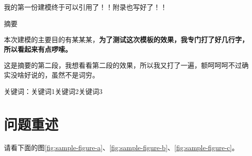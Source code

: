 \documentclass[a4paper,12pt]{ctexart} %
\let\heiti\relax
\begin{document}
    \begin{center}
        {\heiti \Large  我的第一份建模终于可以引用了！！附录也写好了！！\\[10pt]} 

        {\heiti \large  摘要\\[10pt]}
    \end{center}
    \setlength\parindent{2em} %
    
    本次建模的主要目的有某某某，\textbf{为了测试这次模板的效果，我专门打了好几行字，所以看起来有点啰嗦。}

    这是摘要的第二段，我想看看第二段的效果，所以我又打了一遍，额呵呵呵不过确实没啥好说的，虽然不是词穷。
    

    \setlength\parindent{0em} %

    {\heiti \normalsize 关键词：}{{\small 关键词1\quad  关键词2\quad   关键词3}}

    \newpage

    \section{问题重述}

    \setlength\parindent{2em}
    
    请看下面的图\ref{fig:sample-figure-a}、\ref{fig:sample-figure-b}、\ref{fig:sample-figure-c}。
\end{document}
